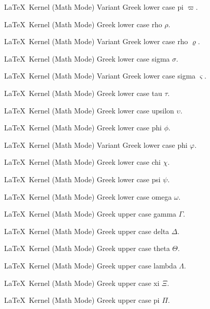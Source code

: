 %
 {}%
 {\LaTeX\ Kernel (Math Mode)}%
 {Variant Greek lower case pi \ensuremath{\varpi}.}%
 {}

%
 {}%
 {\LaTeX\ Kernel (Math Mode)}%
 {Greek lower case rho \ensuremath{\rho}.}%
 {}

%
 {}%
 {\LaTeX\ Kernel (Math Mode)}%
 {Variant Greek lower case rho \ensuremath{\varrho}.}%
 {}

%
 {}%
 {\LaTeX\ Kernel (Math Mode)}%
 {Greek lower case sigma \ensuremath{\sigma}.}%
 {}

%
 {}%
 {\LaTeX\ Kernel (Math Mode)}%
 {Variant Greek lower case sigma \ensuremath{\varsigma}.}%
 {}

%
 {}%
 {\LaTeX\ Kernel (Math Mode)}%
 {Greek lower case tau \ensuremath{\tau}.}%
 {}

%
 {}%
 {\LaTeX\ Kernel (Math Mode)}%
 {Greek lower case upsilon \ensuremath{\upsilon}.}%
 {}

%
 {}%
 {\LaTeX\ Kernel (Math Mode)}%
 {Greek lower case phi \ensuremath{\phi}.}%
 {}

%
 {}%
 {\LaTeX\ Kernel (Math Mode)}%
 {Variant Greek lower case phi \ensuremath{\varphi}.}%
 {}

%
 {}%
 {\LaTeX\ Kernel (Math Mode)}%
 {Greek lower case chi \ensuremath{\chi}.}%
 {}

%
 {}%
 {\LaTeX\ Kernel (Math Mode)}%
 {Greek lower case psi \ensuremath{\psi}.}%
 {}

%
 {}%
 {\LaTeX\ Kernel (Math Mode)}%
 {Greek lower case omega \ensuremath{\omega}.}%
 {}

%
 {}%
 {\LaTeX\ Kernel (Math Mode)}%
 {Greek upper case gamma \ensuremath{\Gamma}.}%
 {}

%
 {}%
 {\LaTeX\ Kernel (Math Mode)}%
 {Greek upper case delta \ensuremath{\Delta}.}%
 {}

%
 {}%
 {\LaTeX\ Kernel (Math Mode)}%
 {Greek upper case theta \ensuremath{\Theta}.}%
 {}

%
 {}%
 {\LaTeX\ Kernel (Math Mode)}%
 {Greek upper case lambda \ensuremath{\Lambda}.}%
 {}

%
 {}%
 {\LaTeX\ Kernel (Math Mode)}%
 {Greek upper case xi \ensuremath{\Xi}.}%
 {}

%
 {}%
 {\LaTeX\ Kernel (Math Mode)}%
 {Greek upper case pi \ensuremath{\Pi}.}%
 {}

